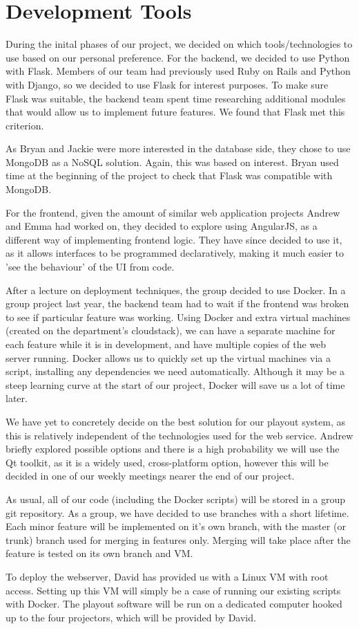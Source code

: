 \documentclass[a4paper]{article}
\begin{document}
\section{Development Tools}
During the inital phases of our project, we decided on which tools/technologies to use based on our personal preference. For the backend, we decided to use Python with Flask. Members of our team had previously used Ruby on Rails and Python with Django, so we decided to use Flask for interest purposes. To make sure Flask was suitable, the backend team spent time researching additional modules that would allow us to implement future features. We found that Flask met this criterion.

As Bryan and Jackie were more interested in the database side, they chose to use MongoDB as a NoSQL solution. Again, this was based on interest. Bryan used time at the beginning of the project to check that Flask was compatible with MongoDB. 

For the frontend, given the amount of similar web application projects Andrew and Emma had worked on, they decided to explore using AngularJS, as a different way of implementing frontend logic. They have since decided to use it, as it allows interfaces to be programmed declaratively, making it much easier to 'see the behaviour' of the UI from code.

After a lecture on deployment techniques, the group decided to use Docker. In a group project last year, the backend team had to wait if the frontend was broken to see if particular feature was working. Using Docker and extra virtual machines (created on the department's cloudstack), we can have a separate machine for each feature while it is in development, and have multiple copies of the web server running. Docker allows us to quickly set up the virtual machines via a script, installing any dependencies we need automatically. Although it may be a steep learning curve at the start of our project, Docker will save us a lot of time later. 

We have yet to concretely decide on the best solution for our playout system, as this is relatively independent of the technologies used for the web service. Andrew briefly explored possible options and there is a high probability we will use the Qt toolkit, as it is a widely used, cross-platform option, however this will be decided in one of our weekly meetings nearer the end of our project.

As usual, all of our code (including the Docker scripts) will be stored in a group git repository. As a group, we have decided to use branches with a short lifetime. Each minor feature will be implemented on it's own branch, with the master (or trunk) branch used for merging in features only. Merging will take place after the feature is tested on its own branch and VM. 

To deploy the webserver, David has provided us with a Linux VM with root access. Setting up this VM will simply be a case of running our existing scripts with Docker. The playout software will be run on a dedicated computer hooked up to the four projectors, which will be provided by David. 
\end{document}
